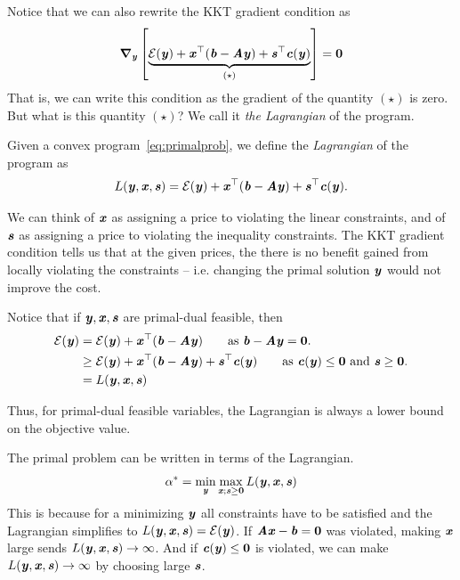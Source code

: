 {Notice that we can also rewrite the KKT gradient condition as
\[
  \grad_{\yy}
  \left[ \underbrace{\energy(\yy) + \xx^{\trp}(\bb-\AA\yy) +
      \ss^{\trp}\cc(\yy)
    }_{(\star)}
    \right]
= \veczero
  \]
That is, we can write this condition as the gradient of the quantity
$(\star)$ is zero.
But what is this quantity $(\star)$?
We call it \emph{the Lagrangian} of the program.

\begin{definition}
Given a convex program~\eqref{eq:primalprob}, we define the
\emph{Lagrangian} of the program as
\begin{equation*} L(\yy, \xx, \ss) = \energy(\yy) +
  \xx^{\trp}(\bb-\AA\yy) + \ss^{\trp}\cc(\yy). \end{equation*}


We can think of $\xx$ as assigning a price to violating the linear
constraints, and of $\ss$ as assigning a price to violating the
inequality constraints.
The KKT gradient condition tells us that at the given prices, the
there is no benefit gained from locally violating the constraints --
i.e. changing the primal solution $\yy$ would not improve the cost.

Notice that if $\yy,\xx,\ss$ are primal-dual feasible, then
\begin{align}
  \energy(\yy)
  &= \energy(\yy) + \xx^{\trp}(\bb-\AA\yy)  \tag*{as
  $\bb-\AA\yy = \veczero$.}\\
    &\geq \energy(\yy) + \xx^{\trp}(\bb-\AA\yy) + \ss^{\top} \cc(\yy)  \tag*{as
      $\cc(\yy) \leq \veczero$ and $\ss \geq \veczero$.}\\
  &= L(\yy,\xx,\ss) \label{eq:weakdual}
\end{align}

Thus, for primal-dual feasible variables, the Lagrangian is always a
lower bound on the objective value.


The primal problem can be written in terms of the Lagrangian.
\begin{equation}
  \label{eq:primalminmax}
  \alpha^* = \min_{\yy}\max_{\xx; \ss\geq\veczero} L(\yy, \xx, \ss)
\end{equation}
This is because for a minimizing $\yy$ all constraints have to be satisfied and the Lagrangian simplifies to $L(\yy,\xx,\ss) = \energy(\yy)$.
If $\AA\xx - \bb = \veczero$ was violated, making $\xx$ large sends $L(\yy,\xx,\ss) \rightarrow \infty$.
And if $\cc(\yy) \leq \veczero$ is violated, we can make $L(\yy,\xx,\ss) \rightarrow \infty$ by choosing large $\ss$.


\end{definition}}
